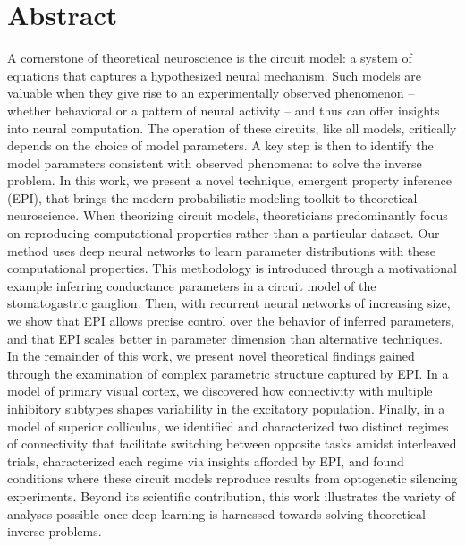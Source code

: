 \documentclass[11pt]{article}
\begin{document}
\section{Abstract}
A cornerstone of theoretical neuroscience is the circuit model: a system of equations that captures a hypothesized neural mechanism.  
Such models are valuable when they give rise to an experimentally observed phenomenon -- whether behavioral or a pattern of neural activity -- and thus can offer insights into neural computation.
The operation of these circuits, like all models, critically depends on the choice of model parameters.
A key step is then to identify the model parameters consistent with observed phenomena: to solve the inverse problem.
In this work, we present a novel technique, emergent property inference (EPI), that brings the modern probabilistic modeling toolkit to theoretical neuroscience.
When theorizing circuit models, theoreticians predominantly focus on reproducing computational properties rather than a particular dataset.
Our method uses deep neural networks to learn parameter distributions with these computational properties.
This methodology is introduced through a motivational example inferring conductance parameters in a circuit model of the stomatogastric ganglion.
Then, with recurrent neural networks of increasing size, we show that EPI allows precise control over the behavior of inferred parameters, and that EPI scales better in parameter dimension than alternative techniques.
In the remainder of this work, we present novel theoretical findings gained through the examination of complex parametric structure captured by EPI.
In a model of primary visual cortex, we discovered how connectivity with multiple inhibitory subtypes shapes variability in the excitatory population.
Finally, in a model of superior colliculus, we identified and characterized two distinct regimes of connectivity that facilitate switching between opposite tasks amidst interleaved trials,  characterized each regime via insights afforded by EPI, and found conditions where these circuit models reproduce results from optogenetic silencing experiments.
Beyond its scientific contribution, this work illustrates the variety of analyses possible once deep learning is harnessed towards solving theoretical inverse problems.
\end{document}
